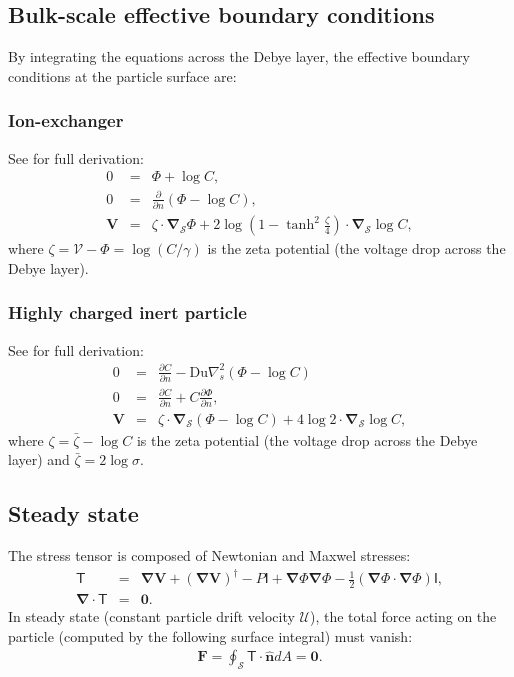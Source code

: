 \documentclass[10pt]{ijnam}
\newcommand{\deriv}[2]{\frac{\partial #1}{\partial #2}}
\newcommand{\pars}[1]{\left(#1\right)}
\newcommand\bnabla{\boldsymbol{\nabla}}
\newcommand\bV{\boldsymbol{V}}
\newcommand\bF{\boldsymbol{F}}
\newcommand\bnhat{\hat{\boldsymbol{n}}}
\newcommand\bzero{\boldsymbol{0}}
\newcommand\cU{\mathscr{U}}
\newcommand\cV{\mathscr{V}}
\newcommand\tI{\mathsf{I}}
\newcommand\tT{\mathsf{T}}
\begin{document}
\subsection{Bulk-scale effective boundary conditions}
By integrating the equations across the Debye layer,
the effective boundary conditions at the particle surface are:
\subsubsection{Ion-exchanger} See \cite{yariv2010migration} for full derivation:
\begin{eqnarray*} 
0 &=& \varPhi + \log C, \\ 
0 &=& \deriv{}{n} \pars{\varPhi - \log C}, \\ 
\bV &=& 
\zeta \cdot \bnabla_\mathcal{S} \varPhi 
+ 2\log\pars{1-\tanh^2\frac{\zeta}{4}} \cdot \bnabla_\mathcal{S} \log C,
\end{eqnarray*}
where $\zeta = \cV - \varPhi = \log (C / \gamma)$ 
is the zeta potential (the voltage drop across the Debye layer).

\subsubsection{Highly charged inert particle}
See \cite{schnitzer2012surface} for full derivation:
\begin{eqnarray*} 
0 &=& {\deriv{C}{n} - \text{Du} \nabla^2_s \pars{\varPhi - \log C}} \\ 
0 &=& {\deriv{C}{n} + C \deriv{\varPhi}{n}}, \\ 
\bV &=& \zeta \cdot \bnabla_\mathcal{S} \pars{\varPhi - \log C} +
4 \log 2 \cdot \bnabla_\mathcal{S} \log C,
\end{eqnarray*}
where $\zeta = \bar{\zeta} - \log C$ 
is the zeta potential (the voltage drop across the Debye layer)
and $\bar{\zeta} = 2 \log \sigma$.

\subsection{Steady state}
The stress tensor is composed of Newtonian and Maxwel stresses:
\begin{eqnarray*} 
\tT &=& \bnabla \bV + (\bnabla \bV)^\dagger - P \tI
+ \bnabla \varPhi \bnabla \varPhi - \frac{1}{2} (\bnabla \varPhi \cdot \bnabla \varPhi) \tI, \\
 \bnabla \cdot \tT &=& \bzero.
\end{eqnarray*}
In steady state (constant particle drift velocity $\cU$), the total force acting on the particle 
(computed by the following surface integral) must vanish:
\begin{eqnarray*}
 \bF = \oint_\mathcal{S} \tT \cdot \bnhat dA = \bzero.
\end{eqnarray*}
\end{document}
